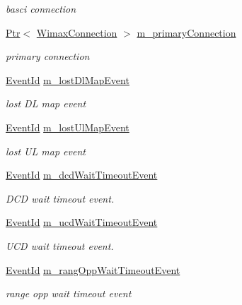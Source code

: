 \begin{DoxyCompactItemize}
\begin{DoxyCompactList}\small\item\em basci connection \end{DoxyCompactList}\item 
\hyperlink{classns3_1_1Ptr}{Ptr}$<$ \hyperlink{classns3_1_1WimaxConnection}{Wimax\+Connection} $>$ \hyperlink{classns3_1_1SubscriberStationNetDevice_a269b0f9be1f02abe86f5a08cf9def186}{m\+\_\+primary\+Connection}
\begin{DoxyCompactList}\small\item\em primary connection \end{DoxyCompactList}\item 
\hyperlink{classns3_1_1EventId}{Event\+Id} \hyperlink{classns3_1_1SubscriberStationNetDevice_ab31d06096944d8a14e8b3cdea766b7dd}{m\+\_\+lost\+Dl\+Map\+Event}
\begin{DoxyCompactList}\small\item\em lost DL map event \end{DoxyCompactList}\item 
\hyperlink{classns3_1_1EventId}{Event\+Id} \hyperlink{classns3_1_1SubscriberStationNetDevice_afc6403e6c18d6504b99f94968007548e}{m\+\_\+lost\+Ul\+Map\+Event}
\begin{DoxyCompactList}\small\item\em lost UL map event \end{DoxyCompactList}\item 
\hyperlink{classns3_1_1EventId}{Event\+Id} \hyperlink{classns3_1_1SubscriberStationNetDevice_a2d6d83100a39bc0c374fd7702acbe573}{m\+\_\+dcd\+Wait\+Timeout\+Event}
\begin{DoxyCompactList}\small\item\em D\+CD wait timeout event. \end{DoxyCompactList}\item 
\hyperlink{classns3_1_1EventId}{Event\+Id} \hyperlink{classns3_1_1SubscriberStationNetDevice_a851bc1fe752fe52544c8efdc7ac0e20a}{m\+\_\+ucd\+Wait\+Timeout\+Event}
\begin{DoxyCompactList}\small\item\em U\+CD wait timeout event. \end{DoxyCompactList}\item 
\hyperlink{classns3_1_1EventId}{Event\+Id} \hyperlink{classns3_1_1SubscriberStationNetDevice_a8d99447f6007d4de371405c64dc0c155}{m\+\_\+rang\+Opp\+Wait\+Timeout\+Event}
\begin{DoxyCompactList}\small\item\em range opp wait timeout event \end{DoxyCompactList}\item 

\end{DoxyCompactItemize}
